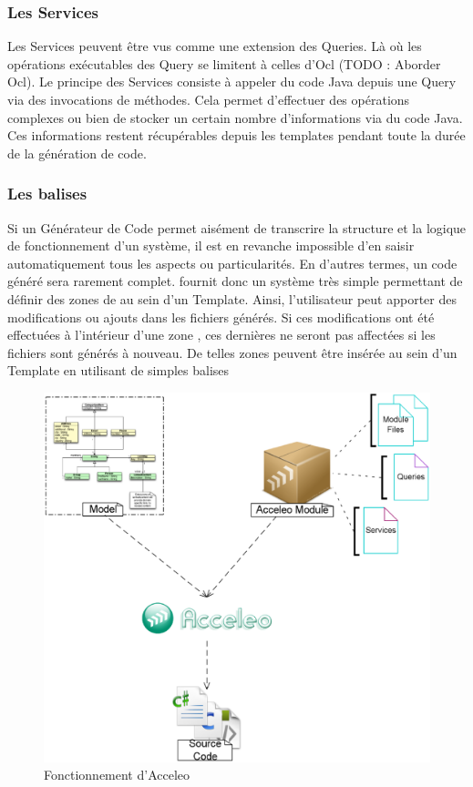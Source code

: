 \subsubsection{Les Services}

Les Services peuvent être vus comme une extension des Queries. Là où les opérations exécutables des Query se limitent à celles d'Ocl (TODO : Aborder Ocl). Le principe des Services consiste à appeler du code Java depuis une Query via des invocations de méthodes. Cela permet d'effectuer des opérations complexes ou bien de stocker un certain nombre d'informations via du code Java. Ces informations restent récupérables depuis les templates pendant toute la durée de la génération de code.

\subsubsection{Les balises }

Si un Générateur de Code permet aisément de transcrire la structure et la logique de fonctionnement d'un système, il est en revanche impossible d'en saisir automatiquement tous les aspects ou particularités. En d'autres termes, un code généré sera rarement complet. \kwacceleo fournit donc un système très simple permettant de définir des zones de  au sein d'un Template. Ainsi, l'utilisateur peut apporter des modifications ou ajouts dans les fichiers générés. Si ces modifications ont été effectuées à l'intérieur d'une zone , ces dernières ne seront pas affectées si les fichiers sont générés à nouveau. De telles zones peuvent être insérée au sein d'un Template en utilisant de simples balises \guim{\textit{\textbf{[protected]}}}

\begin{figure}[htb]
  \centering
  \includegraphics[scale=0.29]{img/acceleo_scheme.eps}
  \caption{Fonctionnement d'Acceleo}
  \label{fig:acceleo}
\end{figure}

